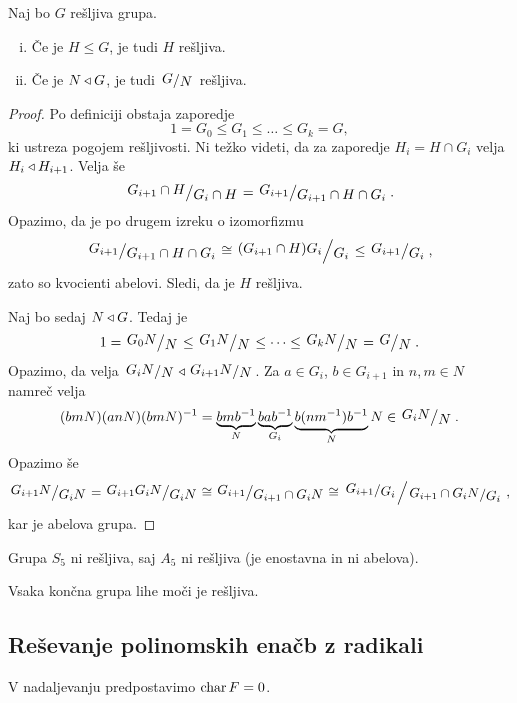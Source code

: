 \begin{trditev}
Naj bo $G$ rešljiva grupa.

\begin{enumerate}[i)]
\item Če je $H \leq G$, je tudi $H$ rešljiva.
\item Če je $N \triangleleft G$, je tudi $\kvoc{G}{N}$ rešljiva.
\end{enumerate}
\end{trditev}

\begin{proof}
Po definiciji obstaja zaporedje
\[
1 = G_0 \leq G_1 \leq \dots \leq G_k = G,
\]
ki ustreza pogojem rešljivosti. Ni težko videti, da za zaporedje
$H_i = H \cap G_i$ velja $H_i \triangleleft H_{i+1}$. Velja še
\[
\kvoc{G_{i+1} \cap H}{G_i \cap H} =
\kvoc{G_{i+1}}{G_{i+1} \cap H \cap G_i}.
\]
Opazimo, da je po drugem izreku o izomorfizmu
\[
\kvoc{G_{i+1}}{G_{i+1} \cap H \cap G_i} \cong
\kvoc{(G_{i+1} \cap H) G_i}{G_i} \leq
\kvoc{G_{i+1}}{G_i},
\]
zato so kvocienti abelovi. Sledi, da je $H$ rešljiva.

Naj bo sedaj $N \triangleleft G$. Tedaj je
\[
1 = \kvoc{G_0 N}{N} \leq \kvoc{G_1 N}{N} \leq \dots \leq
\kvoc{G_k N}{N} = \kvoc{G}{N}.
\]
Opazimo, da velja $\kvoc{G_i N}{N} \edn \kvoc{G_{i+1} N}{N}$. Za
$a \in G_i$, $b \in G_{i+1}$ in $n, m \in N$ namreč velja
\[
(bmN)(anN)(bmN)^{-1} =
\underbrace{bmb^{-1}}_N
\underbrace{bab^{-1}}_{G_i}
\underbrace{b(nm^{-1})b^{-1}}_N N \in
\kvoc{G_i N}{N}.
\]
Opazimo še
\[
\kvoc{G_{i+1} N}{G_i N} =
\kvoc{G_{i+1} G_i N}{G_i N} \cong
\kvoc{G_{i+1}}{G_{i+1} \cap G_i N} \cong
\kvoc{\kvoc{G_{i+1}}{G_i}}{\kvoc{G_{i+1} \cap G_i N}{G_i}},
\]
kar je abelova grupa.
\end{proof}

\begin{opomba}
Grupa $S_5$ ni rešljiva, saj $A_5$ ni rešljiva (je enostavna in ni
abelova).
\end{opomba}

\begin{izrek}
Vsaka končna grupa lihe moči je rešljiva.
\end{izrek}

\newpage

\subsection{Reševanje polinomskih enačb z radikali}

V nadaljevanju predpostavimo $\operatorname{char} F = 0$.

